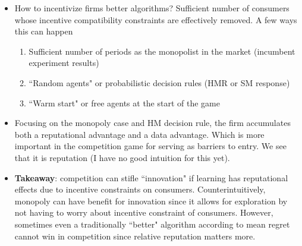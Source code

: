 \documentclass[11pt,letterpaper]{article}
\begin{document}
\begin{itemize}
\item How to incentivize firms better algorithms? Sufficient number of consumers whose incentive compatibility constraints are effectively removed. A few ways this can happen
\begin{enumerate}
\item Sufficient number of periods as the monopolist in the market (incumbent experiment results)
\item ``Random agents" or probabilistic decision rules (HMR or SM response)
\item ``Warm start" or free agents at the start of the game
\end{enumerate}
\item Focusing on the monopoly case and HM decision rule, the firm accumulates both a reputational advantage and a data advantage. Which is more important in the competition game for serving as barriers to entry. We see that it is reputation (I have no good intuition for this yet).
\item \textbf{Takeaway}: competition can stifle ``innovation" if learning has reputational effects due to incentive constraints on consumers. Counterintuitively, monopoly can have benefit for innovation since it allows for exploration by not having to worry about incentive constraint of consumers. However, sometimes even a traditionally ``better" algorithm according to mean regret cannot win in competition since relative reputation matters more.

\end{itemize}
\end{document}
